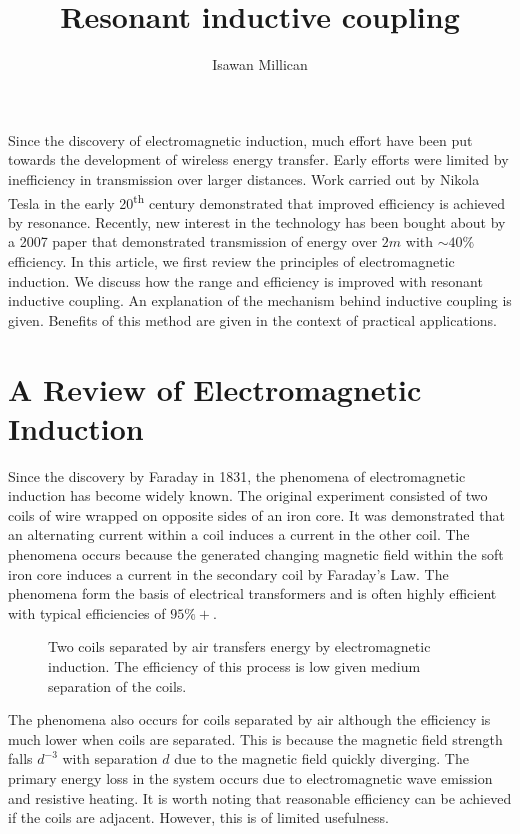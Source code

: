 \documentclass[a4paper,justified,nobib]{tufte-handout}
\begin{document}
\title{Resonant inductive coupling}
\author{Isawan Millican}
\maketitle

Since the discovery of electromagnetic induction,
much effort have been put towards the development of wireless energy transfer.
Early efforts were limited by inefficiency in transmission over larger distances.
Work carried out by Nikola Tesla in the early 20\textsuperscript{th} century
demonstrated that improved efficiency is achieved by resonance.\cite{tesla}
Recently, new interest in the technology has been bought about by a 2007
paper that demonstrated transmission of energy over $2m$ with $\sim40\%$ efficiency.
In this article, we first review the principles of electromagnetic induction.
We discuss how the range and efficiency is improved with
resonant inductive coupling.
An explanation of the mechanism behind inductive coupling is given.
Benefits of this method are given in the context of practical applications.



\section{A Review of Electromagnetic Induction}

Since the discovery by Faraday in 1831,
the phenomena of electromagnetic induction has become widely known. 
\cite{faradaypublishedfirst}
The original experiment consisted of two coils of wire wrapped on opposite
sides of an iron core.
It was demonstrated that an alternating current within a coil induces
a current in the other coil.
The phenomena occurs because the generated changing magnetic
field within the soft iron core induces a current in the secondary coil by
Faraday's Law.
The phenomena form the basis of electrical transformers and
is often highly efficient with typical efficiencies of $95\%+$.

\begin{figure}
  \center
  
  \caption{Two coils separated by air transfers energy by
  electromagnetic induction.
  The efficiency of this process is low given medium separation of the coils.}
\end{figure}

The phenomena also occurs for coils separated by air
although the efficiency is much lower when coils are separated.
This is because the magnetic field strength falls $d^{-3}$ with separation $d$
due to the magnetic field quickly diverging.
The primary energy loss in the system occurs due to electromagnetic wave emission
and resistive heating.
It is worth noting that reasonable efficiency can be achieved if the coils
are adjacent.
However, this is of limited usefulness.
\end{document}
